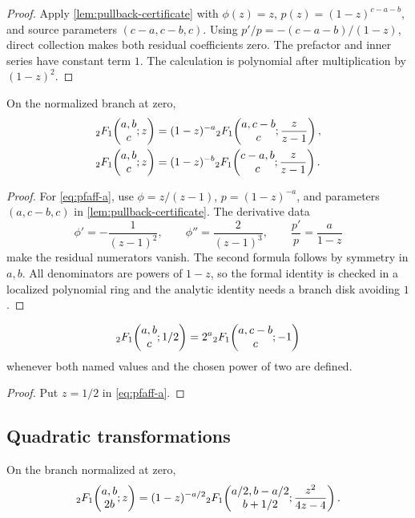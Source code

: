 \begin{proof}
Apply \cref{lem:pullback-certificate} with \(\phi(z)=z\),
\(p(z)=(1-z)^{c-a-b}\), and source parameters
\((c-a,c-b,c)\).  Using
\(p'/p=-(c-a-b)/(1-z)\), direct collection makes both residual
coefficients zero.  The prefactor and inner series have constant term \(1\).
The calculation is polynomial after multiplication by \((1-z)^2\).
\end{proof}

\begin{theorem}\label{thm:pfaff}
On the normalized branch at zero,
\begin{align}
 {}_2F_1\!\left(\begin{matrix}a,b\\c\end{matrix};z\right)
 &=(1-z)^{-a}
   {}_2F_1\!\left(\begin{matrix}a,c-b\\c\end{matrix};\frac{z}{z-1}\right),
   \label{eq:pfaff-a}\\
 {}_2F_1\!\left(\begin{matrix}a,b\\c\end{matrix};z\right)
 &=(1-z)^{-b}
   {}_2F_1\!\left(\begin{matrix}c-a,b\\c\end{matrix};\frac{z}{z-1}\right).
   \label{eq:pfaff-b}
\end{align}
\end{theorem}

\begin{proof}
For \eqref{eq:pfaff-a}, use
\(\phi=z/(z-1)\), \(p=(1-z)^{-a}\), and parameters
\((a,c-b,c)\) in \cref{lem:pullback-certificate}.  The derivative data
\[
 \phi'=-\frac1{(z-1)^2},\qquad
 \phi''=\frac2{(z-1)^3},\qquad
 \frac{p'}p=\frac a{1-z}
\]
make the residual numerators vanish.  The second formula follows by symmetry
in \(a,b\).  All denominators are powers of \(1-z\), so the formal identity
is checked in a localized polynomial ring and the analytic identity needs a
branch disk avoiding \(1\).
\end{proof}

\begin{corollary}\label{cor:half-minus-one}
\[
 {}_2F_1\!\left(\begin{matrix}a,b\\c\end{matrix};1/2\right)=2^a{}_2F_1\!\left(\begin{matrix}a,c-b\\c\end{matrix};-1\right)
\]
whenever both named values and the chosen power of two are defined.
\end{corollary}

\begin{proof}
Put \(z=1/2\) in \eqref{eq:pfaff-a}.
\end{proof}

\subsection{Quadratic transformations}

\begin{theorem}\label{thm:quadratic}
On the branch normalized at zero,
\begin{equation}\label{eq:quadratic}
 {}_2F_1\!\left(\begin{matrix}a,b\\2b\end{matrix};z\right)
 =(1-z)^{-a/2}
 {}_2F_1\!\left(\begin{matrix}a/2,b-a/2\\b+1/2\end{matrix};\frac{z^2}{4z-4}\right).
\end{equation}
\end{theorem}

